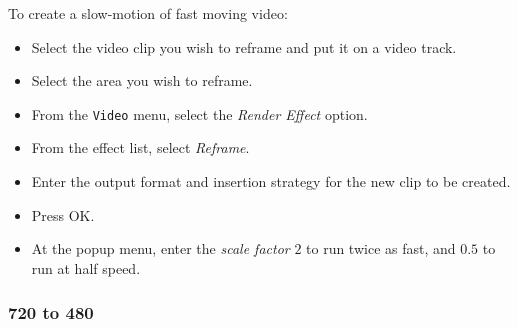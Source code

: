 To create a slow-motion of fast moving video:

\begin{itemize}
    \item Select the video clip you wish to reframe and put it on a video track.
    \item Select the area you wish to reframe.
    \item From the \texttt{Video} menu, select the \textit{Render Effect} option.
    \item From the effect list, select \textit{Reframe}.
    \item Enter the output format and insertion strategy for the new clip to be created.
    \item Press OK.
    \item At the popup menu, enter the \textit{scale factor} $2$ to run twice as fast, and $0.5$ to run at half speed.
\end{itemize}

\subsubsection*{720 to 480}%
\label{ssub:720_to_480}


